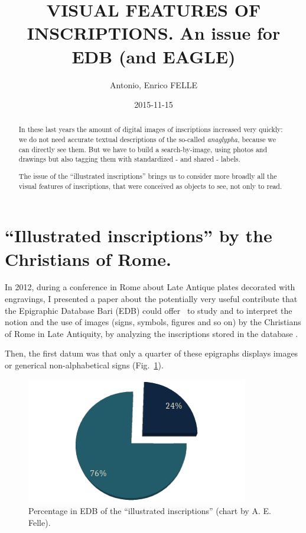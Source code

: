 \documentclass[amsthm,ebook]{saparticle}
\title{VISUAL FEATURES OF INSCRIPTIONS. An issue for EDB (and EAGLE)}
\author[uniba]{Antonio, Enrico FELLE\corref{first}}
\date{2015-11-15}
\begin{document}
\maketitle
\begin{abstract}
In these last years the amount of digital images of inscriptions increased very quickly: we do not need accurate textual
descriptions of the so-called \emph{anaglypha}, because we can directly see them. But we have to build a search-by-image,
using photos and drawings but also tagging them with standardized - and shared - labels. 

The issue of the ``illustrated inscriptions'' brings us to consider more broadly all the
visual features of inscriptions, that were conceived as objects to see, not only to read.
\end{abstract}




\section{``Illustrated inscriptions'' by the Christians of Rome.}
\noindent In 2012, during a conference in Rome about Late Antique plates decorated with engravings, I presented a paper about the
potentially very useful contribute that the Epigraphic Database Bari (EDB) could offer \ to study and to interpret the
notion and the use of images (signs, symbols, figures and so on) by the Christians of Rome in Late Antiquity, by
analyzing the inscriptions stored in the database \citep{felle_apporto_2013}. 

Then, the first datum was that only a quarter of these epigraphs displays images or generical non-alphabetical signs
\citep[101]{felle_apporto_2013} (Fig.~\ref{fig:1}).

\begin{figure}[!htbp]
\centering
 \includegraphics[scale=0.5]{FelleVisualFeaturesofinscriptionsEAGLE2016FullPaper-img000.png}
\caption{Percentage in EDB of the ``illustrated inscriptions'' (chart by A. E. Felle).}
\label{fig:1}
\end{figure}
\end{document}

